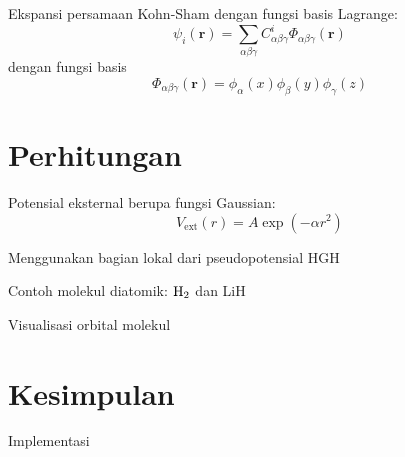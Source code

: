 \documentclass[%
reprint,
amsmath,
amssymb,
aps,
]{revtex4-1}
\begin{document}
Ekspansi persamaan Kohn-Sham dengan fungsi basis Lagrange:
\begin{equation}
\psi_{i}(\mathbf{r}) = \sum_{\alpha\beta\gamma}
C^{i}_{\alpha\beta\gamma} \Phi_{\alpha\beta\gamma}(\mathbf{r})
\end{equation}
dengan fungsi basis \cite{Baye2015}
\begin{equation}
\Phi_{\alpha\beta\gamma}(\mathbf{r}) =
\phi_{\alpha}(x)\phi_{\beta}(y)\phi_{\gamma}(z)
\end{equation}




\section{Perhitungan}

Potensial eksternal berupa fungsi Gaussian:
\begin{equation}
V_{\mathrm{ext}}(r) = A\exp(-\alpha r^2)
\end{equation}

Menggunakan bagian lokal dari pseudopotensial HGH

Contoh molekul diatomik: $\ce{H2}$ dan LiH

Visualisasi orbital molekul

\section{Kesimpulan}

Implementasi


\end{document}
